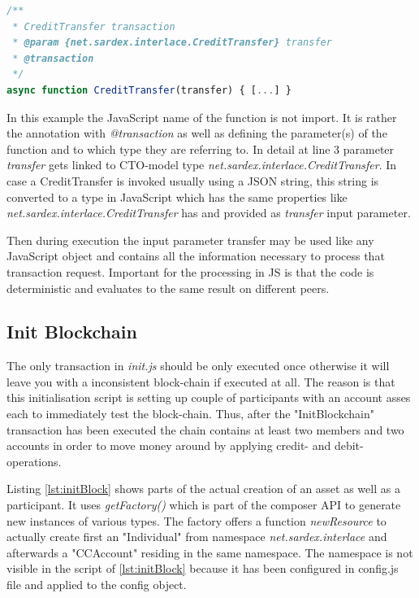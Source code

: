 \begin{center}
\begin{minipage}{0.8\textwidth}
\small
\begin{lstlisting}[language=javascript,firstnumber=1,caption={\bf\small Connection of JavaScript function CreditTransfer to CTO-model transaction type}, captionpos=b,label=lst:linkTransaction]
/**
 * CreditTransfer transaction
 * @param {net.sardex.interlace.CreditTransfer} transfer
 * @transaction
 */
async function CreditTransfer(transfer) { [...] }
\end{lstlisting}
\end{minipage}
\end{center}

In this example the JavaScript name of the function is not import. It is rather the annotation with \textit{@transaction} as well as defining the parameter(s) of the function and to which type they are referring to. In detail at line 3 parameter \textit{transfer} gets linked to CTO-model type \textit{net.sardex.interlace.CreditTransfer}. In case a CreditTransfer is invoked usually using a JSON string, this string is converted to a type in JavaScript which has the same properties like \textit{net.sardex.interlace.CreditTransfer} has and provided as \textit{transfer} input parameter.

Then during execution the input parameter transfer may be used like any JavaScript object and contains all the information necessary to process that transaction request. Important for the processing in JS is that the code is deterministic and evaluates to the same result on different peers.

\subsection{Init Blockchain}

The only transaction in \textit{init.js} should be only executed once otherwise it will leave you with a inconsistent block-chain if executed at all. The reason is that this initialisation script is setting up couple of participants with an account asses each to immediately test the block-chain. Thus, after the "InitBlockchain" transaction has been executed the chain contains at least two members and two accounts in order to move money around by applying credit- and debit-operations.

Listing \ref{lst:initBlock} shows parts of the actual creation of an asset as well as a participant. It uses \textit{getFactory()} which is part of the composer API to generate new instances of various types. The factory offers a function \textit{newResource} to actually create first an "Individual" from namespace \textit{net.sardex.interlace} and afterwards a "CCAccount" residing in the same namespace. The namespace is not visible in the script of \ref{lst:initBlock} because it has been configured in config.js file and applied to the config object.

